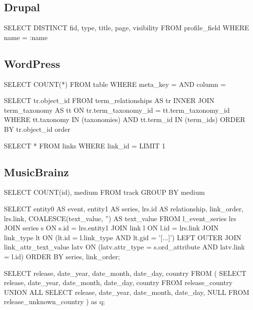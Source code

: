 \documentclass[11pt,a4paper]{globis-book}
\begin{document}
\subsection*{Drupal}
\begin{setq}
SELECT DISTINCT
  fid,
  type,
  title,
  page,
  visibility
FROM profile_field
WHERE name = :name
\end{setq}

\subsection*{WordPress}
\begin{setq}
SELECT COUNT(*)
FROM table
WHERE meta_key = %
  AND column = %
\end{setq}
\begin{setq}
SELECT tr.object_id
FROM
  term_relationships AS tr INNER JOIN term_taxonomy AS tt
  ON tr.term_taxonomy_id = tt.term_taxonomy_id
WHERE tt.taxonomy IN (taxonomies)
  AND tt.term_id IN (term_ids)
ORDER BY tr.object_id order
\end{setq}
\begin{setq}
SELECT *
FROM links
WHERE link_id = %
LIMIT 1
\end{setq}

\subsection*{MusicBrainz}
\begin{setq}
SELECT
  COUNT(id),
  medium
FROM track
GROUP BY medium
\end{setq}
\begin{setq}
SELECT
  entity0 AS event,
  entity1 AS series,
  lrs.id AS relationship,
  link_order,
  lrs.link,
  COALESCE(text_value, '') AS text_value
FROM l_event_series lrs
  JOIN series s ON s.id = lrs.entity1
  JOIN link l ON l.id = lrs.link
  JOIN link_type lt ON (lt.id = l.link_type AND lt.gid = '[...]')
  LEFT OUTER JOIN link_attr_text_value latv
    ON (latv.attr_type = s.ord_attribute AND latv.link = l.id)
ORDER BY
  series,
  link_order;
\end{setq}
\begin{setq}
SELECT
  release,
  date_year,
  date_month,
  date_day,
  country
FROM
  (
    SELECT
      release,
      date_year,
      date_month,
      date_day,
      country
    FROM release_country
    UNION ALL
    SELECT
      release,
      date_year,
      date_month,
      date_day,
      NULL
    FROM release_unknown_country
  ) as q;
\end{setq}
\end{document}
